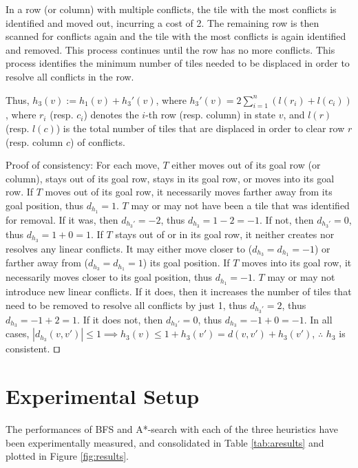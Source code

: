 \documentclass[runningheads]{llncs}
\begin{document}
In a row (or column) with multiple conflicts, the tile with the most conflicts is identified and moved out, incurring a cost of 2. The remaining row is then scanned for conflicts again and the tile with the most conflicts is again identified and removed. This process continues until the row has no more conflicts. This process identifies the minimum number of tiles needed to be displaced in order to resolve all conflicts in the row.

Thus, $h_3(v) := h_1(v) + h_3'(v)$, where $h_3'(v) = 2 \sum_{i=1}^n (l(r_i) + l(c_i))$, where $r_i$ (resp. $c_i$) denotes the $i$-th row (resp. column) in state $v$, and $l(r)$ (resp. $l(c)$) is the total number of tiles that are displaced in order to clear row $r$ (resp. column $c$) of conflicts.

Proof of consistency:
For each move, $T$ either moves out of its goal row (or column), stays out of its goal row, stays in its goal row, or moves into its goal row.
If $T$ moves out of its goal row, it necessarily moves farther away from its goal position, thus $d_{h_1} = 1$. $T$ may or may not have been a tile that was identified for removal. If it was, then $d_{h_3'} = -2$, thus $d_{h_3} = 1-2 = -1$. If not, then $d_{h_3'} = 0$, thus $d_{h_3} = 1+0 = 1$.
If $T$ stays out of or in its goal row, it neither creates nor resolves any linear conflicts. It may either move closer to ($d_{h_3} = d_{h_1} = -1$) or farther away from ($d_{h_3} = d_{h_1} = 1$) its goal position.
If $T$ moves into its goal row, it necessarily moves closer to its goal position, thus $d_{h_1} = -1$. $T$ may or may not introduce new linear conflicts. If it does, then it increases the number of tiles that need to be removed to resolve all conflicts by just 1, thus $d_{h_3'} = 2$, thus $d_{h_3} = -1+2 = 1$. If it does not, then $d_{h_3'} = 0$, thus $d_{h_3} = -1+0 = -1$.
In all cases, $|d_{h_3}(v,v')|\leq 1 \implies h_3(v) \leq 1+h_3(v') = d(v,v')+h_3(v')$, $\therefore$ $h_3$ is consistent. $\qed$




\section{Experimental Setup}

The performances of BFS and A*-search with each of the three heuristics have been experimentally measured, and consolidated in Table \ref{tab:aresults} and plotted in Figure \ref{fig:results}.
\end{document}
